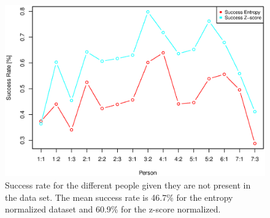 \begin{figure}[H]
\centering
\includegraphics[width = 0.95 \textwidth]{graphics/successRate_randomForest_comp}
\caption{Success rate for the different people given they are not present in the data set. The mean success rate is 46.7\% for the entropy normalized dataset and 60.9\% for the z-score normalized.}
\label{fig:success_randomForest}
\end{figure}